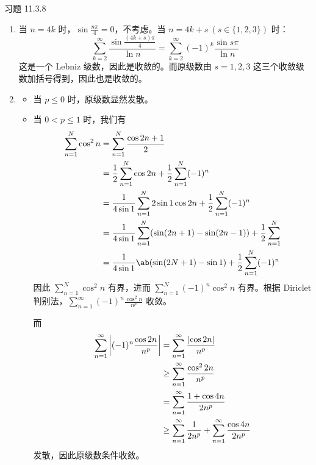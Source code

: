 \begin{problem}
    习题 11.3.8
    \begin{solution}
        \begin{enumerate}
            \item[\textbf{1)}] 当 $n = 4k$ 时，$\sin \frac{n \pi}{4} = 0$，不考虑。当 $n = 4k + s\ (s \in \{1, 2, 3\})$ 时：
            $$
            \sum_{k = 2}^{\infty} \frac{\sin \frac{(4k + s) \pi}{4}}{\ln n} = \sum_{k = 2}^{\infty} (-1)^{k} \frac{\sin s \pi}{\ln n}
            $$
            这是一个 Lebniz 级数，因此是收敛的。而原级数由 $s = 1, 2, 3$ 这三个收敛级数加括号得到，因此也是收敛的。

            \item[\textbf{2)}]
            \begin{itemize}
                \item 当 $p \le 0$ 时，原级数显然发散。
                \item 当 $0 < p \le 1$ 时，我们有
                $$
                \begin{aligned}
                    \sum_{n = 1}^{N} \cos^2 n & = \sum_{n = 1}^{N} \frac{\cos 2n + 1}{2} \\
                    & = \frac{1}{2} \sum_{n = 1}^{N} \cos 2n + \frac{1}{2} \sum_{n = 1}^{N} (-1)^{n} \\
                    & = \frac{1}{4 \sin 1} \sum_{n = 1}^{N} 2 \sin 1 \cos 2n + \frac{1}{2} \sum_{n = 1}^{N} (-1)^{n} \\
                    & = \frac{1}{4 \sin 1} \sum_{n = 1}^{N} (\sin (2n + 1) - \sin (2n - 1)) + \frac{1}{2} \sum_{n = 1}^{N} \\
                    & = \frac{1}{4 \sin 1} \ab(\sin (2N + 1) - \sin 1) + \frac{1}{2} \sum_{n = 1}^{N} (-1)^{n}
                \end{aligned}
                $$
                因此 $\sum\limits_{n = 1}^{N} \cos^2 n$ 有界，进而 $\sum\limits_{n = 1}^{N} (-1)^{n} \cos^2 n$ 有界。根据 Diriclet 判别法，$\sum\limits_{n = 1}^{\infty} (-1)^{n} \frac{\cos^2 n}{n^{p}}$ 收敛。

                而
                $$
                \begin{aligned}
                    \sum_{n = 1}^{\infty} \abs{(-1)^{n} \frac{\cos 2n}{n^{p}}} & = \sum_{n = 1}^{\infty} \frac{\abs{\cos 2n}}{n^{p}} \\
                    & \ge \sum_{n = 1}^{\infty} \frac{\cos^2 2n}{n^{p}} \\
                    & = \sum_{n = 1}^{\infty} \frac{1 + \cos 4n}{2 n^{p}} \\
                    & \ge \sum_{n = 1}^{\infty} \frac{1}{2 n^{p}} + \sum_{n = 1}^{\infty} \frac{\cos 4n}{2 n^{p}}
                \end{aligned}
                $$
                发散，因此原级数条件收敛。


\end{itemize}
\end{enumerate}
\end{solution}
\end{problem}
